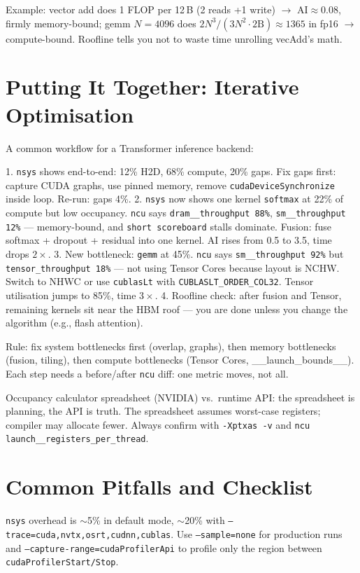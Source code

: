 Example: vector add does 1 FLOP per 12\,B (2 reads +1 write) $\to$ AI$\approx$0.08, firmly memory-bound; gemm $N{=}4096$ does $2N^{3}/(3N^{2}\cdot2\text{B})\approx 1365$ in fp16 $\to$ compute-bound. Roofline tells you not to waste time unrolling vecAdd's math.

\section{Putting It Together: Iterative Optimisation}
A common workflow for a Transformer inference backend:

1. \texttt{nsys} shows end-to-end: 12\% H2D, 68\% compute, 20\% gaps. Fix gaps first: capture CUDA graphs, use pinned memory, remove \texttt{cudaDeviceSynchronize} inside loop. Re-run: gaps 4\%.
2. \texttt{nsys} now shows one kernel \texttt{softmax} at 22\% of compute but low occupancy. \texttt{ncu} says \texttt{dram\_\_throughput 88\%}, \texttt{sm\_\_throughput 12\%} --- memory-bound, and \texttt{short scoreboard} stalls dominate. Fusion: fuse softmax + dropout + residual into one kernel. AI rises from 0.5 to 3.5, time drops $2\times$.
3. New bottleneck: \texttt{gemm} at 45\%. \texttt{ncu} says \texttt{sm\_\_throughput 92\%} but \texttt{tensor\_throughput 18\%} --- not using Tensor Cores because layout is NCHW. Switch to NHWC or use \texttt{cublasLt} with \texttt{CUBLASLT\_ORDER\_COL32}. Tensor utilisation jumps to 85\%, time $3\times$.
4. Roofline check: after fusion and Tensor, remaining kernels sit near the HBM roof --- you are done unless you change the algorithm (e.g., flash attention).

Rule: fix system bottlenecks first (overlap, graphs), then memory bottlenecks (fusion, tiling), then compute bottlenecks (Tensor Cores, \_\_launch\_bounds\_\_). Each step needs a before/after \texttt{ncu} diff: one metric moves, not all.

\begin{remark}
Occupancy calculator spreadsheet (NVIDIA) vs.\ runtime API: the spreadsheet is planning, the API is truth. The spreadsheet assumes worst-case registers; compiler may allocate fewer. Always confirm with \texttt{-Xptxas -v} and \texttt{ncu} \texttt{launch\_\_registers\_per\_thread}.
\end{remark}


\section{Common Pitfalls and Checklist}
\texttt{nsys} overhead is $\sim$5\% in default mode, $\sim$20\% with \texttt{--trace=cuda,nvtx,osrt,cudnn,cublas}. Use \texttt{--sample=none} for production runs and \texttt{--capture-range=cudaProfilerApi} to profile only the region between \texttt{cudaProfilerStart/Stop}.

